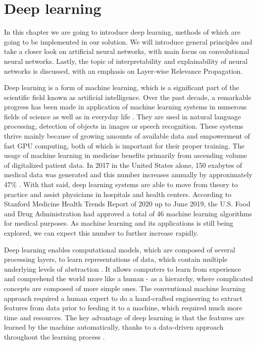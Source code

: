 
\chapter{Deep learning}
In this chapter we are going to introduce deep learning, methods of which are going to be implemented in our solution. We will introduce general principles and take a closer look on artificial neural networks, with main focus on convolutional neural networks. Lastly, the topic of interpretability and explainability of neural networks is discussed, with an emphasis on Layer-wise Relevance Propagation.

Deep learning is a form of machine learning, which is a significant part of the scientific field known as artificial intelligence. Over the past decade, a remarkable progress has been made in application of machine learning systems in numerous fields of science as well as in everyday life \cite{longsurvey2018}. They are used in natural language processing, detection of objects in images or speech recognition. These systems thrive mainly because of growing amounts of available data and empowerment of fast GPU computing, both of which is important for their proper training. The usage of machine learning in medicine benefits primarily from ascending volume of digitalized patient data. In 2017 in the United States alone, 150 exabytes of medical data was generated and this number increases annually by approximately 47\% \cite{stanford2017}. With that said, deep learning systems are able to move from theory to practice and assist physicians in hospitals and health centers. According to Stanford Medicine Health Trends Report of 2020 \cite{stanford2020} up to June 2019, the U.S. Food and Drug Administration had approved a total of 46 machine learning algorithms for medical purposes. As machine learning and its applications is still being explored, we can expect this number to further increase rapidly.

Deep learning enables computational models, which are composed of several processing layers, to learn representations of data, which contain multiple  underlying levels of abstraction \cite{greekDeepLearning}. It allows computers to learn from experience and comprehend the world more like a human - as a hierarchy, where complicated concepts are composed of more simple ones. \cite{deeplearningbook} The conventional machine learning approach required a human expert to do a hand-crafted engineering to extract features from data prior to feeding it to a machine, which required much more time and resources. The key advantage of deep learning is that the features are learned by the machine automatically, thanks to a data-driven approach throughout the learning process \cite{deeplearningHealthcare}. 



